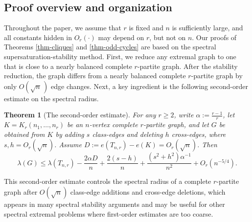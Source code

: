 \documentclass[11pt,a4paper]{article}
\newtheorem{theorem}{Theorem}[section]
\theoremstyle{definition}
\theoremstyle{plain}
\renewcommand{\le}{\leqslant}
\renewcommand{\ge}{\geqslant}
\begin{document}
\subsection{Proof overview and organization}

Throughout the paper, we assume that $r$ is fixed and $n$ is sufficiently large,  and all constants hidden in 
$O_r(\cdot)$ may depend on $r$, but not on $n$.    
Our proofs of Theorems \ref{thm-cliques} and \ref{thm-odd-cycles} are based on the spectral supersaturation-stability method. First, we reduce any extremal graph to one that is close to a nearly balanced complete $r$-partite graph. 
After the stability reduction, the graph differs from a nearly balanced complete
$r$-partite graph by only $O(\sqrt n\,)$ edge changes. Next, a key ingredient is the following second-order estimate on the spectral radius. 


\begin{theorem}[The second-order estimate]
\label{thm:local-spectral}
For any $r\ge 2$, write $\alpha:=\frac{r-1}{r}$, let $K=K_r(n_1,\dots,n_r)$ be an
$n$-vertex complete $r$-partite graph, and let $G$ be obtained from $K$ by adding
$s$ class-edges and deleting $h$ cross-edges, where $s,h=O_r(\sqrt n)$. Assume
$D:=e(T_{n,r})-e(K)=O_r(\sqrt n)$. Then
\begin{equation*}
        \lambda(G)\le \lambda(T_{n,r})-\frac{2\alpha D}{n}+\frac{2(s-h)}{n}
        +\frac{(s^2+h^2)\alpha^{-1}}{n^2}+O_r(n^{-5/4}). 
\end{equation*}
\end{theorem}

This second-order estimate controls the spectral radius of a complete $r$-partite graph after $O(\sqrt n)$ class-edge additions 
and cross-edge deletions, 
which appears in many
spectral stability arguments and may be useful for other spectral extremal problems where first-order estimates are too coarse. 
\end{document}

